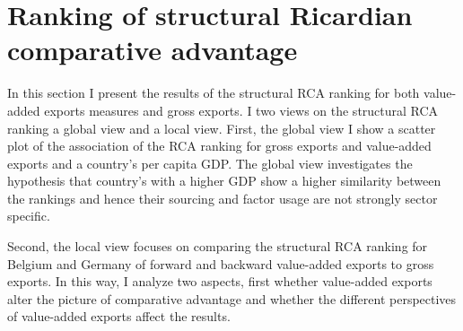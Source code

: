 \section{Ranking of structural Ricardian comparative advantage }
In this section I present the results of the structural RCA ranking for both value-added exports measures and gross exports.
I  two views on the structural RCA ranking a global view and a local view.
First, the global view I show a scatter plot of the association of the RCA ranking for gross exports and value-added exports and a country's per capita GDP.
The global view investigates the hypothesis that country's with a higher GDP show a higher similarity between the rankings and hence their sourcing and factor usage are not strongly sector specific. \par
Second, the local view focuses on comparing the structural RCA ranking for Belgium and Germany of forward and backward value-added exports to gross exports.
In this way, I analyze two aspects, first whether value-added exports alter the picture of comparative advantage and whether the different perspectives of value-added exports affect the results.
